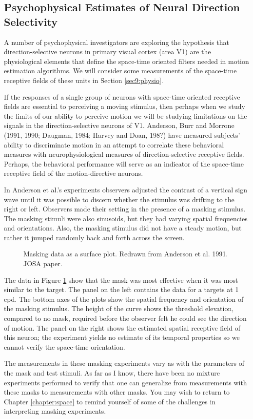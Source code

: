 \subsection{Psychophysical Estimates of Neural Direction Selectivity}
A number of psychophysical investigators are exploring
the hypothesis that 
direction-selective neurons in primary visual cortex (area V1)
are the physiological elements that
define the space-time oriented filters needed in motion
estimation algorithms.
We will consider some measurements of the space-time
receptive fields of these units in Section \ref{sec9:physio}.

If the responses of a single group of neurons
with space-time oriented receptive fields
are essential to perceiving a moving stimulus, then perhaps
when we study the limits of our ability to perceive
motion we will be studying limitations on the signals
in the direction-selective neurons of V1.
Anderson, Burr and Morrone (1991, 1990;
Daugman, 1984; Harvey and Doan, 198?) have measured
subjects' ability to discriminate motion in an attempt
to correlate these behavioral measures with
neurophysiological measures of direction-selective
receptive fields.
Perhaps, the behavioral performance will serve as an indicator
of the space-time receptive field of the 
motion-directive neurons.

In Anderson et al.'s experiments observers
adjusted the contrast of
a vertical sign wave until it was possible
to discern whether the stimulus was drifting to the right or left.
Observers made their setting in the presence of a
masking stimulus.
The masking stimuli were also sinusoids, but 
they had varying spatial frequencies and orientations.
Also, the masking stimulus did not have a steady motion,
but rather it jumped randomly back and forth across the screen.

\begin{figure}
\centerline{
}
\caption[Direction of Motion in the Presence of Masking Stimuli]{
Masking data as a surface plot.
Redrawn from Anderson et al. 1991. JOSA paper.
}
\label{f9:motionMask}
\end{figure}
The data in Figure \ref{f9:motionMask} show that the
mask was most effective when it was most similar to the
target.
The panel on the left contains the data for 
a targets at 1 cpd.
The bottom axes of the plots show the spatial frequency
and orientation of the masking stimulus.
The height of the curve shows the threshold elevation,
compared to no mask,
required before the observer felt he could see the
direction of motion.
The panel on the right shows the estimated
spatial receptive field of this neuron;
the experiment yields no estimate of its temporal
properties so we cannot verify the space-time orientation.

The measurements in these masking experiments
vary as with the parameters of the mask and test stimuli.
As far as I know, there have been no mixture experiments
performed to verify that one can generalize from
measurements with these masks to measurements with
other masks.
You may wish to return to
Chapter \ref{chapter:space} to remind yourself of
some of the challenges in interpreting
masking experiments.


